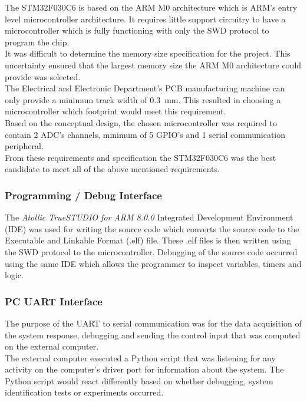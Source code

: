 The STM32F030C6 is based on the ARM M0 architecture which is ARM's entry level microcontroller architecture. It requires little support circuitry to have a microcontroller which is fully  functioning with only the SWD protocol to program the chip.\\

It was difficult to determine the memory size specification for the project. This uncertainty ensured that the largest memory size the ARM M0 architecture could provide was selected.\\

The Electrical and Electronic Department's PCB manufacturing machine can only provide a  minimum track width of \SI{0.3}{mm}. This resulted in choosing a microcontroller which footprint would meet this requirement.\\

Based on the conceptual design, the chosen microcontroller was required to contain 2 ADC's channels, minimum of 5 GPIO's and 1 serial communication peripheral.\\

From these requirements and specification the STM32F030C6 was the best candidate to meet all of the above mentioned requirements.

\subsubsection{Programming / Debug Interface}
The \textit{Atollic TrueSTUDIO for ARM 8.0.0} Integrated Development Environment (IDE) was used for writing the source code which converts the source code to the Executable and Linkable Format (.elf) file. These .elf files is then written using the SWD protocol to the microcontroller. Debugging of the source code occurred using the same IDE which allows the programmer to inspect variables, timers and logic.

\subsubsection{PC UART Interface }

The purpose of the UART to serial communication was for the data acquisition of the system response, debugging and sending the control input that was computed on the external computer.\\

The external computer executed a Python script that was listening for any activity on the computer's driver port for information about the system. The Python script would react differently based on whether debugging, system identification tests or experiments occurred.\\

